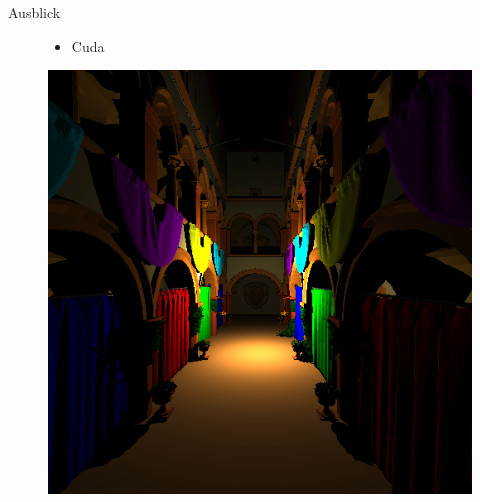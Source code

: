 	\begin{frame}{Ausblick}
		\begin{figure}[ht]
		\vspace{1cm}
        	\begin{minipage}{0.45\linewidth}
		\begin{itemize}
			\item Cuda
		\end{itemize}
		\vspace{4.5cm}
		\end{minipage}
		\begin{minipage}[b]{0.45\linewidth}
            \centering
            \includegraphics[width=\textwidth]{images/sponza.png}
        	\end{minipage}
        	
	\end{figure}
		
	\end{frame}

